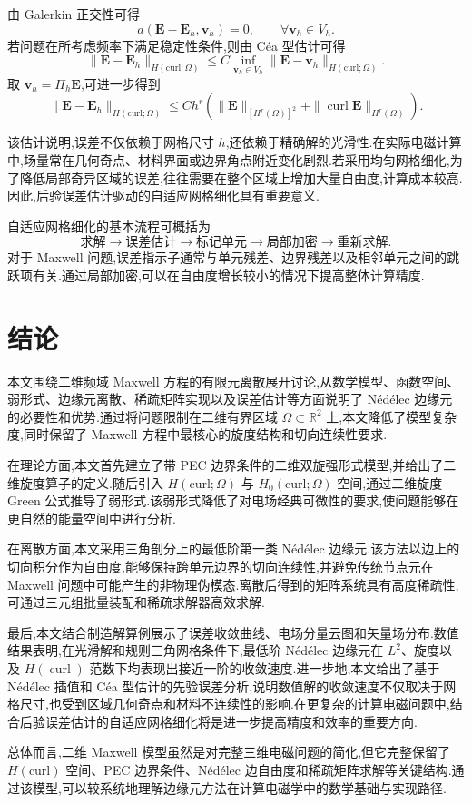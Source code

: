 \documentclass[12pt,hyperref,a4paper,UTF8,twoside]{ctexart}
\newcommand{\curl}{\operatorname{curl}}
\newcommand{\E}{\bm{E}}
\newcommand{\R}{\mathbb{R}}
\begin{document}
由 Galerkin 正交性可得
\[
a(\E-\E_h,\bm{v}_h)=0,
\qquad
\forall \bm{v}_h\in V_h.
\]
若问题在所考虑频率下满足稳定性条件,则由 Céa 型估计可得
\[
\|\E-\E_h\|_{H(\text{curl};\Omega)}
\le
C
\inf_{\bm{v}_h\in V_h}
\|\E-\bm{v}_h\|_{H(\text{curl};\Omega)}.
\]
取 $\bm{v}_h=\Pi_h\E$,可进一步得到
\[
\|\E-\E_h\|_{H(\text{curl};\Omega)}
\le
C h^r
\left(
\|\E\|_{[H^r(\Omega)]^2}
+
\|\curl\E\|_{H^r(\Omega)}
\right).
\]

该估计说明,误差不仅依赖于网格尺寸 $h$,还依赖于精确解的光滑性.在实际电磁计算中,场量常在几何奇点、材料界面或边界角点附近变化剧烈.若采用均匀网格细化,为了降低局部奇异区域的误差,往往需要在整个区域上增加大量自由度,计算成本较高.因此,后验误差估计驱动的自适应网格细化具有重要意义.

自适应网格细化的基本流程可概括为
\[
\text{求解}
\longrightarrow
\text{误差估计}
\longrightarrow
\text{标记单元}
\longrightarrow
\text{局部加密}
\longrightarrow
\text{重新求解}.
\]
对于 Maxwell 问题,误差指示子通常与单元残差、边界残差以及相邻单元之间的跳跃项有关.通过局部加密,可以在自由度增长较小的情况下提高整体计算精度.

\section{结论}

本文围绕二维频域 Maxwell 方程的有限元离散展开讨论,从数学模型、函数空间、弱形式、边缘元离散、稀疏矩阵实现以及误差估计等方面说明了 Nédélec 边缘元的必要性和优势.通过将问题限制在二维有界区域 $\Omega\subset\R^2$ 上,本文降低了模型复杂度,同时保留了 Maxwell 方程中最核心的旋度结构和切向连续性要求.

在理论方面,本文首先建立了带 PEC 边界条件的二维双旋强形式模型,并给出了二维旋度算子的定义.随后引入 $H(\text{curl};\Omega)$ 与 $H_0(\text{curl};\Omega)$ 空间,通过二维旋度 Green 公式推导了弱形式.该弱形式降低了对电场经典可微性的要求,使问题能够在更自然的能量空间中进行分析.

在离散方面,本文采用三角剖分上的最低阶第一类 Nédélec 边缘元.该方法以边上的切向积分作为自由度,能够保持跨单元边界的切向连续性,并避免传统节点元在 Maxwell 问题中可能产生的非物理伪模态.离散后得到的矩阵系统具有高度稀疏性,可通过三元组批量装配和稀疏求解器高效求解.

最后,本文结合制造解算例展示了误差收敛曲线、电场分量云图和矢量场分布.数值结果表明,在光滑解和规则三角网格条件下,最低阶 Nédélec 边缘元在 $L^2$、旋度以及 $H(\curl)$ 范数下均表现出接近一阶的收敛速度.进一步地,本文给出了基于 Nédélec 插值和 Céa 型估计的先验误差分析,说明数值解的收敛速度不仅取决于网格尺寸,也受到区域几何奇点和材料不连续性的影响.在更复杂的计算电磁问题中,结合后验误差估计的自适应网格细化将是进一步提高精度和效率的重要方向.

总体而言,二维 Maxwell 模型虽然是对完整三维电磁问题的简化,但它完整保留了 $H(\text{curl})$ 空间、PEC 边界条件、Nédélec 边自由度和稀疏矩阵求解等关键结构.通过该模型,可以较系统地理解边缘元方法在计算电磁学中的数学基础与实现路径.
\end{document}
